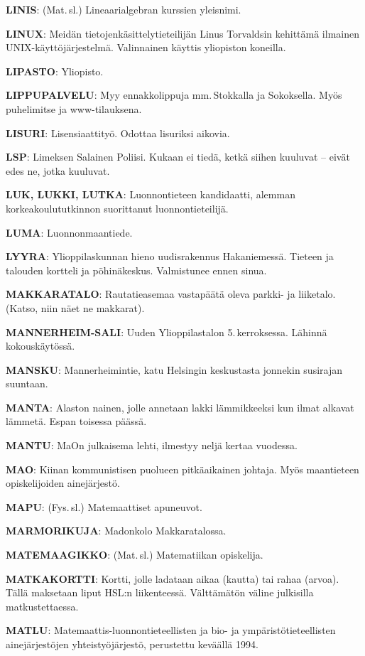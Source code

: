 \documentclass[../ala_hataile.tex]{subfiles}
\begin{document}
\textbf{LINIS}: (Mat.\,sl.) Lineaarialgebran kurssien
yleisnimi.

\textbf{LINUX}: Meidän tietojenkäsittelytieteilijän
Linus Torvaldsin kehittämä ilmainen
UNIX-käyttöjärjestelmä. Valinnainen käyttis
yliopiston koneilla.

\textbf{LIPASTO}: Yliopisto.

\textbf{LIPPUPALVELU}: Myy ennakkolippuja
mm.\,Stokkalla ja Sokoksella. Myös puhelimitse
ja www-tilauksena.

\textbf{LISURI}: Lisensiaattityö. Odottaa lisuriksi
aikovia.

\textbf{LSP}: Limeksen Salainen Poliisi. Kukaan ei
tiedä, ketkä siihen kuuluvat -- eivät edes ne,
jotka kuuluvat.

\textbf{LUK, LUKKI, LUTKA}: Luonnontieteen kandidaatti,
alemman korkeakoulututkinnon
suorittanut luonnontieteilijä.

\textbf{LUMA}: Luonnonmaantiede.

\textbf{LYYRA}: Ylioppilaskunnan hieno uudis\-rakennus Hakaniemessä. Tieteen ja talouden kortteli ja pöhinäkeskus. Valmistunee ennen sinua.

\textbf{MAKKARATALO}: Rautatieasemaa vastapäätä
oleva parkki- ja liiketalo. (Katso,
niin näet ne makkarat).

\textbf{MANNERHEIM-SALI}: Uuden Ylioppilastalon
5.\,kerroksessa. Lähinnä kokouskäytössä.

\textbf{MANSKU}: Mannerheimintie, katu Helsingin
keskustasta jonnekin susirajan suuntaan.

\textbf{MANTA}: Alaston nainen, jolle annetaan
lakki lämmikkeeksi kun ilmat alkavat lämmetä. Espan toisessa päässä.

\textbf{MANTU}: MaOn julkaisema lehti, ilmestyy
neljä kertaa vuodessa.

\textbf{MAO}: Kiinan kommunistisen puolueen
pitkäaikainen johtaja. Myös maantieteen
opiskelijoiden ainejärjestö.

\textbf{MAPU}: (Fys.\,sl.) Matemaattiset apuneuvot.

\textbf{MARMORIKUJA}: Madonkolo Makkaratalossa.

\textbf{MATEMAAGIKKO}: (Mat.\,sl.) Matematiikan
opiskelija.

\textbf{MATKAKORTTI}: Kortti, jolle ladataan
aikaa (kautta) tai rahaa (arvoa). Tällä maksetaan
liput HSL:n liikenteessä. Välttämätön
väline julkisilla matkustettaessa.

\textbf{MATLU}: Matemaattis-luonnontieteellisten ja bio- ja ympäristötieteellisten
ainejärjestöjen yhteistyöjärjestö, perustettu
keväällä 1994.
\end{document}
